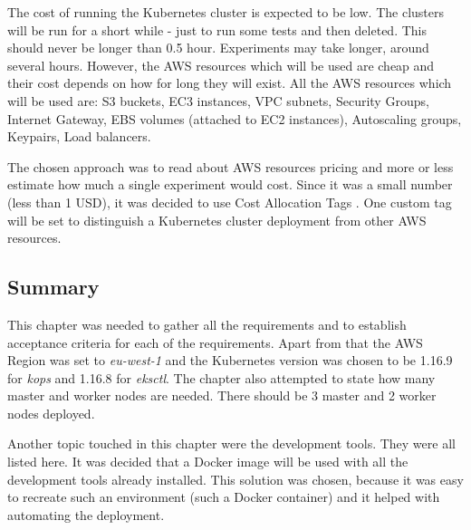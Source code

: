 The cost of running the Kubernetes cluster is expected to be low. The clusters will be run for a short while - just to run some tests and then deleted. This should never be longer than 0.5 hour. Experiments may take longer, around several hours. However, the AWS resources which will be used are cheap and their cost depends on how for long they will exist. All the AWS resources which will be used are: S3 buckets, EC3 instances, VPC subnets, Security Groups, Internet Gateway, EBS volumes (attached to EC2 instances), Autoscaling groups, Keypairs, Load balancers.

The chosen approach was to read about AWS resources pricing and more or less estimate how much a single experiment would cost. Since it was a small number (less than 1 USD), it was decided to use Cost Allocation Tags \cite{amazon-cost-tags}. One custom tag will be set to distinguish a Kubernetes cluster deployment from other AWS resources.

\subsection{Summary}

This chapter was needed to gather all the requirements and to establish acceptance criteria for each of the requirements. Apart from that the AWS Region was set to \textit{eu-west-1} and the Kubernetes version was chosen to be 1.16.9 for \textit{kops} and 1.16.8 for \textit{eksctl}. The chapter also attempted to state how many master and worker nodes are needed. There should be 3 master and 2 worker nodes deployed.

Another topic touched in this chapter were the development tools. They were all listed here. It was decided that a Docker image will be used with all the development tools already installed. This solution was chosen, because it was easy to recreate such an environment (such a Docker container) and it helped with automating the deployment.
